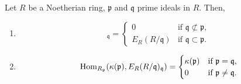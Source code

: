 \begin{prop}
	Let $R$ be a Noetherian ring, $\mathfrak{p}$ and $\mathfrak{q}$ prime ideals in $R$. Then,
	\begin{enumerate}
		\item 
		\begin{equation*} 
			[E_{R}(R/\mathfrak{p})]_{\mathfrak{q}} = 
			\begin{cases}
				0 & \text{if } \mathfrak{q} \not\subset \mathfrak{p}, \\
				E_{R}(R/\mathfrak{q}) & \text{if } \mathfrak{q} \subset \mathfrak{p}.
			\end{cases}
		\end{equation*}
		\item 
		\begin{equation*} 
			\operatorname{Hom}_{R_{\mathfrak{p}}}(\kappa(\mathfrak{p}), E_{R}(R/\mathfrak{q})_{\mathfrak{q}}) = 
			\begin{cases}
				\kappa(\mathfrak{p}) & \text{if } \mathfrak{p} = \mathfrak{q}, \\
				0 & \text{if } \mathfrak{p} \neq \mathfrak{q}.
			\end{cases}
		\end{equation*}
	\end{enumerate}
\end{prop}
